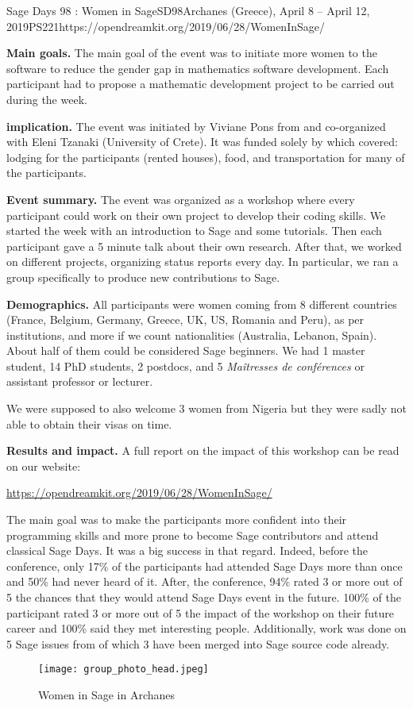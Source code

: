 \begin{event}{Sage Days 98 : Women in Sage}{SD98}{Archanes (Greece), April 8 -- April 12, 2019}{PS}{22}{1}{https://opendreamkit.org/2019/06/28/WomenInSage/}

\textbf{Main goals.} The main goal of the event was to initiate more women to the software \Sage to reduce the gender gap in mathematics software
development. Each participant had to propose a mathematic development project to be carried out during the week.

\textbf{\ODK implication.} The event was initiated by Viviane Pons from \ODK and co-organized with Eleni Tzanaki (University of Crete). It was funded solely by \ODK which covered: lodging for the participants (rented houses), food, and transportation for many of the participants.

\textbf{Event summary.} The event was organized as a workshop where every participant could work on their own project to develop their coding skills. We started the week with an introduction to Sage and some tutorials. Then each participant gave a 5 minute talk about their own research. After that, we worked on different projects, organizing status reports every day. In particular, we ran a group specifically to produce new contributions to Sage.

\textbf{Demographics.} All participants were women coming from 8 different countries (France, Belgium, Germany, Greece, UK, US, Romania and Peru), as per institutions, and more if we count nationalities (Australia, Lebanon, Spain). About half of them could be considered Sage beginners. We had 1 master student, 14 PhD students, 2 postdocs, and 5 \textit{Maîtresses de conférences} or assistant professor or lecturer.

We were supposed to also welcome 3 women from Nigeria but they were sadly not able to obtain their visas on time.

\textbf{Results and impact.} A full report on the impact of this
workshop can be read on our website:
\centerline{\url{https://opendreamkit.org/2019/06/28/WomenInSage/}}
The main goal was to make the participants more confident into their programming skills and more prone to become Sage contributors and attend classical Sage Days. It was a big success in that regard. Indeed, before the conference, only 17\% of the participants had attended Sage Days more than once and 50\% had never heard of it. After, the conference, 94\% rated 3 or more out of 5 the chances that they would attend Sage Days event in the future. 100\% of the participant rated 3 or more out of 5 the impact of the workshop on their future career and 100\% said they met interesting people. Additionally, work was done on 5 Sage issues from of which 3 have been merged into Sage source code already.

\begin{figure}[ht]
\texttt{[image: group\_photo\_head.jpeg]}
\caption*{Women in Sage in Archanes}
\end{figure}



\end{event}
